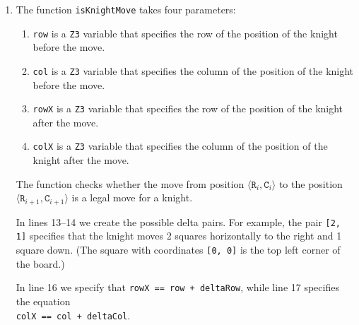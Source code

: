 \begin{enumerate}
\item The function \texttt{isKnightMove} takes four parameters:
      \begin{enumerate}
      \item \texttt{row} is a \texttt{Z3} variable that specifies the row of the position of the knight before
            the move. 
      \item \texttt{col} is a \texttt{Z3} variable that specifies the column of the position of the knight
            before the move. 
      \item \texttt{rowX} is a \texttt{Z3} variable that specifies the row of the position of the knight after
            the move. 
      \item \texttt{colX} is a \texttt{Z3} variable that specifies the column of the position of the knight
            after the move. 
      \end{enumerate}
      The function checks whether the move from position 
      $\langle \mathtt{R}_i, \mathtt{C}_i \rangle$ to the position $\langle \mathtt{R}_{i+1}, \mathtt{C}_{i+1} \rangle$
      is a legal move for a knight.

      In lines 13--14 we create the possible delta pairs.  For example, the pair \texttt{[2, 1]} specifies that
      the knight moves 2 squares horizontally to the right and 1 square down.
      (The square with coordinates  \texttt{[0, 0]} is the top left corner of the board.)

      In line 16 we specify that \texttt{rowX == row + deltaRow}, while line 17 specifies the equation
      \\[0.2cm]
      \hspace*{1.3cm}
      \texttt{colX == col + deltaCol}.
      

\end{enumerate}
